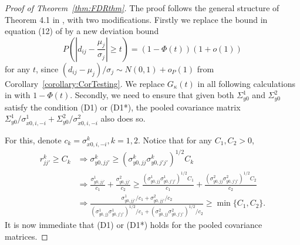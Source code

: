 \begin{proof}[Proof of Theorem~\ref{thm:FDRthm}]
The proof follows the general structure of Theorem 4.1 in \cite{LiuShao14}, with two modifications. Firstly we replace the bound in equation (12) of \cite{LiuShao14} by a new deviation bound
%
$$
P \left( \left| d_{ij} - \frac{\mu_j}{\sigma_j} \right| \geq t \right) = (1 - \Phi(t))(1 + o(1))
$$
%
for any $t$, since $(d_{ij} - \mu_j)/\sigma_j \sim N(0,1) + o_P(1)$ from Corollary~\ref{corollary:CorTesting}. We replace $G_\kappa(t)$ in all following calculations in \cite{LiuShao14} with $1 - \Phi(t)$. Secondly, we need to ensure that given both $\Sigma_{y0}^1$ and $\Sigma_{y0}^2$ satisfy the condition (D1) or (D1*), the pooled covariance matrix $\Sigma_{y0}^1/ \sigma_{x0,i,-i}^1 + \Sigma_{y0}^2/  \sigma_{x0,i,-i}^2$ also does so.

For this, denote $c_k =  \sigma_{x0,i,-i}^k, k = 1,2$. Notice that for any $C_1, C_2 > 0$,
%
\begin{align*}
r_{jj'}^k \geq C_k & \Rightarrow \sigma_{y0,jj'}^k \geq (\sigma_{y0,jj}^k \sigma_{y0,j'j'}^k)^{1/2} C_k\\
& \Rightarrow \frac{\sigma_{y0,jj'}^1}{c_1} + \frac{\sigma_{y0,jj'}^2}{c_2} \geq
\frac{ (\sigma_{y0,jj}^1 \sigma_{y0,j'j'}^1)^{1/2} C_1}{c_1} +
\frac{ (\sigma_{y0,jj}^2 \sigma_{y0,j'j'}^2)^{1/2} C_2}{c_2}\\
& \Rightarrow \frac{ \sigma_{y0,jj'}^1/c_1 + \sigma_{y0,jj'}^2/c_2}
{ (\sigma_{y0,jj}^1 \sigma_{y0,j'j'}^1)^{1/2}/ c_1 + (\sigma_{y0,jj}^2 \sigma_{y0,j'j'}^2)^{1/2}/ c_2}
\geq \min \{ C_1, C_2 \}.
\end{align*}
%
It is now immediate that (D1) or (D1*) holds for the pooled covariance matrices.
\end{proof}



